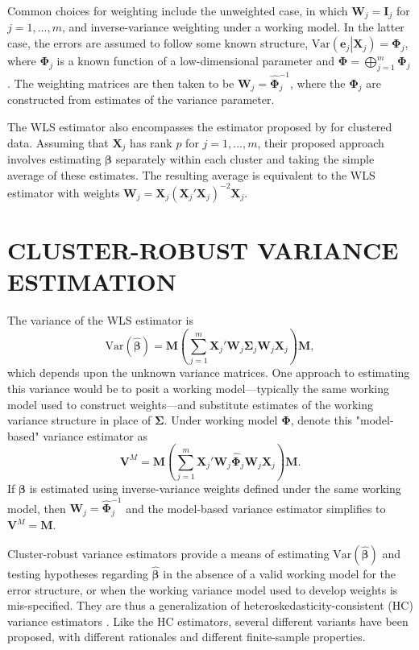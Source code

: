 \documentclass[12pt]{article}\usepackage[]{graphicx}\usepackage[]{color}
\newcommand{\Var}{\text{Var}}
\newcommand{\bm}{\mathbf}
\newcommand{\bs}{\boldsymbol}
\begin{document}
Common choices for weighting include the unweighted case, in which $\bm{W}_j = \bm{I}_j$ for $j = 1,...,m$, and inverse-variance weighting under a working model. 
In the latter case, the errors are assumed to follow some known structure, $\Var\left(\bm{e}_j\left|\bm{X}_j\right.\right) = \bs\Phi_j$, where $\bs\Phi_j$ is a known function of a low-dimensional parameter and $\bs\Phi = \bigoplus_{j=1}^m \bs\Phi_j$. 
The weighting matrices are then taken to be $\bm{W}_j = \hat{\bs\Phi}_j^{-1}$, where the $\hat{\bs\Phi}_j$ are constructed from estimates of the variance parameter.

The WLS estimator also encompasses the estimator proposed by \citet{Ibragimov2010tstatistic} for clustered data. 
Assuming that $\bm{X}_j$ has rank $p$ for $j = 1,...,m$, their proposed approach involves estimating $\bs\beta$ separately within each cluster and taking the simple average of these estimates. 
The resulting average is equivalent to the WLS estimator with weights $\bm{W}_j = \bm{X}_j \left(\bm{X}_j'\bm{X}_j\right)^{-2} \bm{X}_j$.

\section{CLUSTER-ROBUST VARIANCE ESTIMATION}
\label{sec:CRVE}

The variance of the WLS estimator is 
\begin{equation}
\label{eq:var_WLS}
\Var\left(\bs{\hat\beta}\right) = \bm{M}\left(\sum_{j=1}^m \bm{X}_j' \bm{W}_j \bs\Sigma_j \bm{W}_j\bm{X}_j\right) \bm{M},
\end{equation}
which depends upon the unknown variance matrices. 
One approach to estimating this variance would be to posit a working model---typically the same working model used to construct weights---and substitute estimates of the working variance structure in place of $\bs\Sigma$. 
Under working model $\bs\Phi$, denote this "model-based" variance estimator as
\begin{equation}
\label{eq:V_model}
\bm{V}^M = \bm{M}\left(\sum_{j=1}^m \bm{X}_j' \bm{W}_j \hat{\bs\Phi}_j \bm{W}_j\bm{X}_j\right) \bm{M}.
\end{equation}
If $\bs\beta$ is estimated using inverse-variance weights defined under the same working model, then $\bm{W}_j = \hat{\bs\Phi}_j^{-1}$ and the model-based variance estimator simplifies to $\bm{V}^M = \bm{M}$. 

Cluster-robust variance estimators provide a means of estimating $\Var\left(\bs{\hat\beta}\right)$ and testing hypotheses regarding $\hat{\bs\beta}$ in the absence of a valid working model for the error structure, or when the working variance model used to develop weights is mis-specified. 
They are thus a generalization of heteroskedasticity-consistent (HC) variance estimators \citep{MacKinnon1985some}. 
Like the HC estimators, several different variants have been proposed, with different rationales and different finite-sample properties. 
\end{document}
